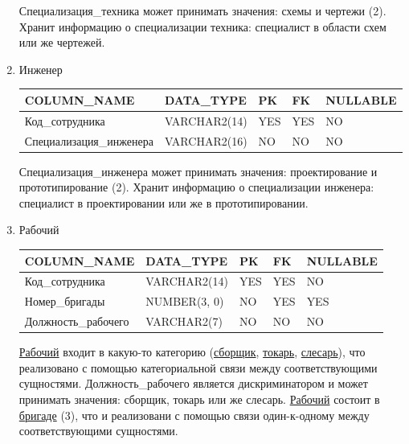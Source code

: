 \begin{enumerate}
\begin{tabular}{|p{7cm}|p{3cm}|p{1cm}|p{1cm}|p{3cm}|}
    \end{tabular}

    Специализация\_техника может принимать значения: схемы и чертежи (2).
    Хранит информацию о специализации техника: специалист в области схем или же чертежей.

    \item{Инженер}

    \begin{tabular}{|p{7cm}|p{3cm}|p{1cm}|p{1cm}|p{3cm}|} \hline

        {\bf COLUMN\_NAME} & {\bf DATA\_TYPE} & {\bf PK} & {\bf FK} & {\bf NULLABLE} \\ \hline
        Код\_сотрудника & VARCHAR2(14) & YES & YES & NO \\ \hline
        Специализация\_инженера & VARCHAR2(16) & NO & NO & NO \\ \hline

    \end{tabular}

    Специализация\_инженера может принимать значения: проектирование и прототипирование (2).
    Хранит информацию о специализации инженера: специалист в проектировании или же в прототипировании.

    \item{Рабочий}

    \begin{tabular}{|p{7cm}|p{3cm}|p{1cm}|p{1cm}|p{3cm}|} \hline

        {\bf COLUMN\_NAME} & {\bf DATA\_TYPE} & {\bf PK} & {\bf FK} & {\bf NULLABLE} \\ \hline
        Код\_сотрудника & VARCHAR2(14) & YES & YES & NO \\ \hline
        Номер\_бригады & NUMBER(3, 0) & NO & YES & YES \\ \hline
        Должность\_рабочего & VARCHAR2(7) & NO & NO & NO \\ \hline

    \end{tabular}

    \underline{Рабочий} входит в какую-то категорию (\underline{сборщик}, \underline{токарь}, \underline{слесарь}), что реализовано с помощью категориальной связи между соответствующими сущностями.
    Должность\_рабочего является дискриминатором и может принимать значения: сборщик, токарь или же слесарь.
    \underline{Рабочий} состоит в \underline{бригаде} (3), что и реализовани с помощью связи один-к-одному между соответствующими сущностями.


\end{enumerate}
